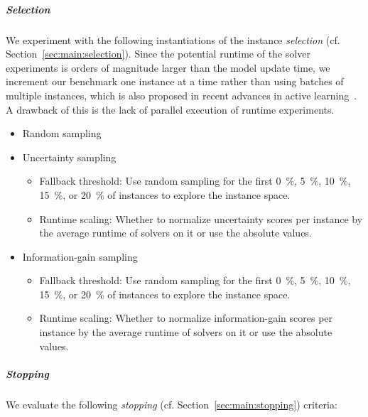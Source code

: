 \documentclass[sn-basic, Numbered]{sn-jnl} %
\begin{document}
\subparagraph{Selection}

We experiment with the following instantiations of the instance \emph{selection} (cf. Section~\ref{sec:main:selection}).
Since the potential runtime of the solver experiments is orders of magnitude larger than the model update time, we increment our benchmark one instance at a time rather than using batches of multiple instances, which is also proposed in recent advances in active learning~\cite{SinhaED19,2019gaal}.
A drawback of this is the lack of parallel execution of runtime experiments.

\begin{itemize}\setlength{\itemsep}{1pt}
  \item Random sampling 
  \item Uncertainty sampling
  \vspace*{-1ex}
  \begin{itemize}\setlength{\itemsep}{1pt}
    \item Fallback threshold: Use random sampling for the first \SI{0}{\%}, \SI{5}{\%}, \SI{10}{\%}, \SI{15}{\%}, or \SI{20}{\%} of instances to explore the instance space.
    \item Runtime scaling: Whether to normalize uncertainty scores per instance by the average runtime of solvers on it or use the absolute values.
  \end{itemize}

  \item Information-gain sampling
  \vspace*{-1ex}
  \begin{itemize}
    \item Fallback threshold: Use random sampling for the first \SI{0}{\%}, \SI{5}{\%}, \SI{10}{\%}, \SI{15}{\%}, or \SI{20}{\%} of instances to explore the instance space.
    \item Runtime scaling: Whether to normalize information-gain scores per instance by the average runtime of solvers on it or use the absolute values.
  \end{itemize}
\end{itemize}

\subparagraph{Stopping}

We evaluate the following \emph{stopping} (cf. Section~\ref{sec:main:stopping}) criteria:
\end{document}
